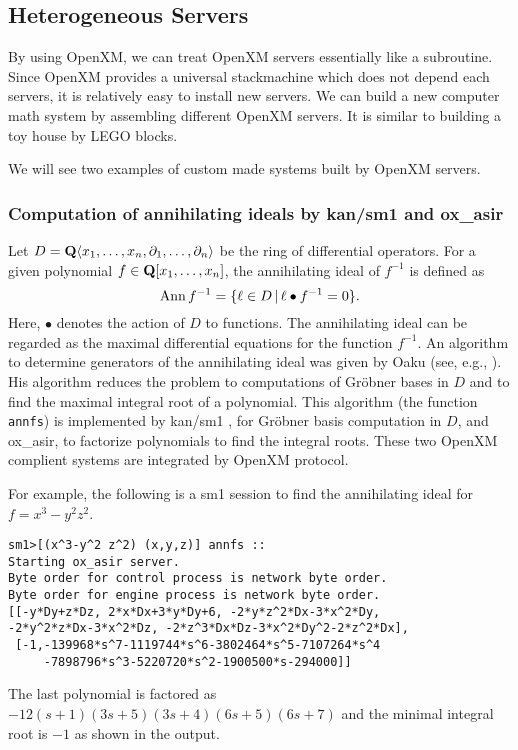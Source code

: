 
\subsection{Heterogeneous Servers}

\def\pd#1{ \partial_{#1} }

By using OpenXM, we can treat OpenXM servers essentially 
like a subroutine.
Since OpenXM provides a universal stackmachine which does not
depend each servers, 
it is relatively easy to install new servers.
We can build a new computer math system by assembling
different OpenXM servers.
It is similar to building a toy house by LEGO blocks.

We will see two examples of custom made systems
built by OpenXM servers.

\subsubsection{Computation of annihilating ideals by kan/sm1 and ox\_asir}

Let $D = {\bf Q} \langle x_1, \ldots, x_n , \pd{1}, \ldots, \pd{n} \rangle$
be the ring of differential operators.
For a given polynomial
$ f \in {\bf Q}[x_1, \ldots, x_n] $,
the annihilating ideal of $f^{-1}$ is defined as
$$ {\rm Ann}\, f^{-1} = \{ \ell \in D \,|\,
  \ell \bullet f^{-1} = 0 \}.
$$
Here, $\bullet$ denotes the action of $D$ to functions.
The annihilating ideal can be regarded as the maximal differential
equations for the function $f^{-1}$.
An algorithm to determine generators of the annihilating ideal
was given by Oaku (see, e.g., \cite[5.3]{sst-book}).
His algorithm reduces the problem to computations of Gr\"obner bases
in $D$ and to find the maximal integral root of a polynomial.
This algorithm (the function {\tt annfs}) is implemented by
kan/sm1 \cite{kan}, for Gr\"obner basis computation in $D$, and
ox\_asir, to factorize polynomials to find the integral
roots.
These two OpenXM complient systems are integrated by
OpenXM protocol.

For example, the following is a sm1 session to find the annihilating
ideal for $f = x^3 - y^2 z^2$.
\begin{verbatim}
sm1>[(x^3-y^2 z^2) (x,y,z)] annfs ::
Starting ox_asir server.
Byte order for control process is network byte order.
Byte order for engine process is network byte order.
[[-y*Dy+z*Dz, 2*x*Dx+3*y*Dy+6, -2*y*z^2*Dx-3*x^2*Dy, 
-2*y^2*z*Dx-3*x^2*Dz, -2*z^3*Dx*Dz-3*x^2*Dy^2-2*z^2*Dx], 
 [-1,-139968*s^7-1119744*s^6-3802464*s^5-7107264*s^4
     -7898796*s^3-5220720*s^2-1900500*s-294000]] 
\end{verbatim}
The last polynomial is factored as
$-12(s+1)(3s+5)(3s+4)(6s+5)(6s+7)$
and the minimal integral root is $-1$
as shown in the output.

